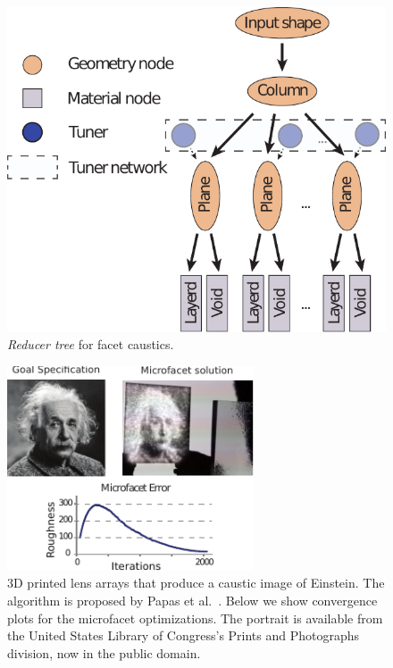 \begin{figure}
\centering
\includegraphics[scale=0.7]{figure/treeFacet.pdf}
\caption {\emph{Reducer tree} for facet caustics.
}
\label{fig:treeFacet}
\end{figure}

\begin{figure}
\centering
\includegraphics[width=0.65\textwidth]{figure/facet.pdf}
\caption {3D printed lens arrays that produce a caustic image of Einstein.
The algorithm is proposed by Papas et al.~.
Below we show convergence plots for the microfacet optimizations.
The portrait is available from the United States Library of Congress's Prints and Photographs division,
now in the public domain.
}
\label{fig:facet}
\end{figure}

